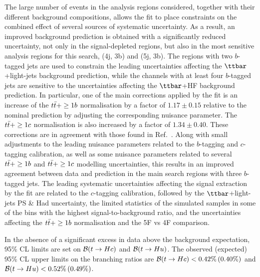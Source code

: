 The large number of events in the analysis regions considered, together with their different background compositions, allows
the fit to place constraints on the combined effect of several sources of systematic uncertainty.
As a result, an improved background prediction is obtained with a significantly reduced uncertainty, not only in the 
signal-depleted regions, but also in the most sensitive analysis regions for this search, (4j, 3b) and (5j, 3b).
The regions with two $b$-tagged jets are used to constrain the leading uncertainties affecting the $\ttbar$+light-jets background prediction,
while the channels with at least four $b$-tagged jets are sensitive to the uncertainties affecting the $\ttbar$+HF background prediction.  
In particular, one of the main corrections applied by the fit is an increase of the $t\bar{t}+\geq1b$ normalisation by a factor of $1.17 \pm  0.15$ 
relative to the nominal prediction by adjusting the corresponding nuisance parameter.  The $t\bar{t}+\geq1c$ normalisation is also increased
by a factor of $1.34 \pm  0.40$. These corrections are in agreement with those found in Ref.~\cite{Aaboud:2017rss}.
Along with small adjustments to the leading nuisance parameters related to the $b$-tagging and $c$-tagging calibration,
as well as some nuisance parameters related to several $t\bar{t}+\geq1b$ and $t\bar{t}+\geq1c$ modelling uncertainties, this results in an improved 
agreement between data and prediction in the main search regions with three $b$-tagged jets.
The leading systematic uncertainties affecting the signal extraction by the fit are related to the $c$-tagging calibration,
followed by the $\ttbar$+light-jets PS \& Had uncertainty, the limited statistics of the simulated samples in some of the bins with 
the highest signal-to-background ratio, and the uncertainties affecting the $t\bar{t}+\geq1b$ normalisation and the 5F vs 4F comparison.

In the absence of a significant excess in data above the background expectation, 95\% CL limits are set on $\mathcal{B}(t\to Hc)$ and $\mathcal{B}(t\to Hu)$.
The observed (expected) 95\% CL upper limits on the branching ratios 
are $\mathcal{B}(t\to Hc)<0.42\%\,(0.40\%)$ and $\mathcal{B}(t\to Hu)<0.52\%\,(0.49\%)$.


